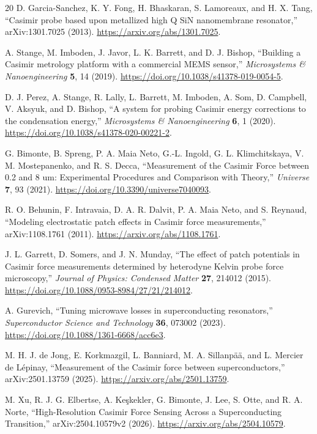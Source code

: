 \documentclass[11pt]{article}
\begin{document}
\begin{thebibliography}{20}
D. Garcia-Sanchez, K. Y. Fong, H. Bhaskaran, S. Lamoreaux, and H. X. Tang,
``Casimir probe based upon metallized high Q SiN nanomembrane resonator,''
arXiv:1301.7025 (2013).
\url{https://arxiv.org/abs/1301.7025}.

A. Stange, M. Imboden, J. Javor, L. K. Barrett, and D. J. Bishop,
``Building a Casimir metrology platform with a commercial MEMS sensor,''
\emph{Microsystems \& Nanoengineering} \textbf{5}, 14 (2019).
\url{https://doi.org/10.1038/s41378-019-0054-5}.

D. J. Perez, A. Stange, R. Lally, L. Barrett, M. Imboden, A. Som,
D. Campbell, V. Aksyuk, and D. Bishop,
``A system for probing Casimir energy corrections to the condensation
energy,''
\emph{Microsystems \& Nanoengineering} \textbf{6}, 1 (2020).
\url{https://doi.org/10.1038/s41378-020-00221-2}.

G. Bimonte, B. Spreng, P. A. Maia Neto, G.-L. Ingold,
G. L. Klimchitskaya, V. M. Mostepanenko, and R. S. Decca,
``Measurement of the Casimir Force between 0.2 and 8 um: Experimental
Procedures and Comparison with Theory,''
\emph{Universe} \textbf{7}, 93 (2021).
\url{https://doi.org/10.3390/universe7040093}.

R. O. Behunin, F. Intravaia, D. A. R. Dalvit, P. A. Maia Neto, and
S. Reynaud,
``Modeling electrostatic patch effects in Casimir force measurements,''
arXiv:1108.1761 (2011).
\url{https://arxiv.org/abs/1108.1761}.

J. L. Garrett, D. Somers, and J. N. Munday,
``The effect of patch potentials in Casimir force measurements determined by
heterodyne Kelvin probe force microscopy,''
\emph{Journal of Physics: Condensed Matter} \textbf{27}, 214012 (2015).
\url{https://doi.org/10.1088/0953-8984/27/21/214012}.

A. Gurevich,
``Tuning microwave losses in superconducting resonators,''
\emph{Superconductor Science and Technology} \textbf{36}, 073002 (2023).
\url{https://doi.org/10.1088/1361-6668/acc6e3}.

M. H. J. de Jong, E. Korkmazgil, L. Banniard, M. A. Sillanp\"a\"a,
and L. Mercier de L\'epinay,
``Measurement of the Casimir force between superconductors,''
arXiv:2501.13759 (2025).
\url{https://arxiv.org/abs/2501.13759}.

M. Xu, R. J. G. Elbertse, A. Ke\c{s}kekler, G. Bimonte, J. Lee,
S. Otte, and R. A. Norte,
``High-Resolution Casimir Force Sensing Across a Superconducting
Transition,''
arXiv:2504.10579v2 (2026).
\url{https://arxiv.org/abs/2504.10579}.

\end{thebibliography}
\endgroup
\end{document}
